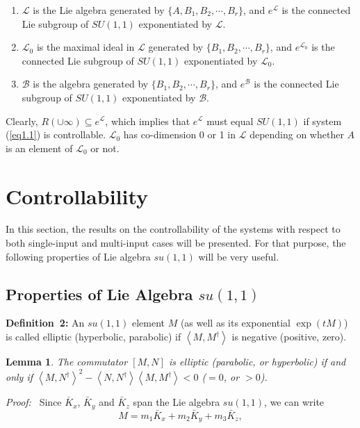 \documentclass[onecolumn,showpacs,showkeys,preprintnumbers]{revtex4}
\newtheorem{lemma}[theorem]{Lemma}
\begin{document}
\noindent\begin{enumerate}\item $\mathcal{L}$ is the Lie algebra
generated by $\{A,B_1,B_2,\cdots,B_r\}$, and $e^\mathcal{L}$ is
the connected Lie subgroup of $SU(1,1)$ exponentiated by
$\mathcal{L}$.

\item $\mathcal{L}_0$ is the maximal ideal in $\mathcal{L}$
generated by $\{B_1,B_2,\cdots,B_r\}$, and $e^{\mathcal{L}_0}$ is
the connected Lie subgroup of $SU(1,1)$ exponentiated by
$\mathcal{L}_0$.

\item $\mathcal{B}$ is the algebra generated by
$\{B_1,B_2,\cdots,B_r\}$, and $e^\mathcal{B}$ is the connected Lie
subgroup of $SU(1,1)$ exponentiated by $\mathcal{B}$.
\end{enumerate}

Clearly, $R(\cup{\infty}){\subseteq}e^\mathcal{L}$, which implies
that $e^\mathcal{L}$ must equal $SU(1,1)$ if system (\ref{eq1.1})
is controllable. $\mathcal{L}_0$ has co-dimension 0 or 1 in
$\mathcal{L}$ depending on whether $A$ is an element of
$\mathcal{L}_0$ or not.

\section{Controllability}\label{sec3}

In this section, the results on the controllability of the systems
with respect to both single-input and multi-input cases will be
presented. For that purpose, the following properties of Lie
algebra $su(1,1)$ will be very useful.

\subsection{Properties of Lie Algebra $su(1,1)$}\label{sec3.1}

{\bf{Definition~2:}} An $su(1,1)$ element $M$ (as well as its
exponential $\exp(tM)$) is called elliptic (hyperbolic, parabolic)
if $\left<M,M^\dag\right>$ is negative (positive, zero).

\noindent\begin{lemma}\label{lemma3.1.1}The commutator $[M,N]$ is elliptic (parabolic, or hyperbolic) if
and only if
$\left<M,N^{\dag}\right>^2-\left<N,N^{\dag}\right>\left<M,M^{\dag}\right><0$
($=0$, or $>0$).
\end{lemma}

{\it{Proof:~}} Since $\bar{K}_x$, $\bar{K}_y$ and
$\bar{K}_z$ span the Lie algebra $su(1,1)$, we can write\noindent\begin{equation}\label{eq3.1.1}M=m_1\bar{K}_x+m_2\bar{K}_y+m_3\bar{K}_z,
\end{equation}
\end{document}
